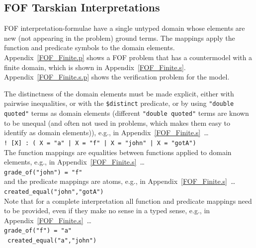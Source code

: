 \documentclass{easychair}
\newcommand{\smalltt}[1]{\small \texttt{#1}}
\begin{document}
\subsection{FOF Tarskian Interpretations}
\label{NewTarskianFOF}

FOF interpretation-formulae have a single untyped domain whose elements are new (not appearing 
in the problem) ground terms. 
The mappings apply the function and predicate symbols to the domain elements.
Appendix~\ref{FOF_Finite.p} shows a FOF problem that has a countermodel with a finite domain, 
which is shown in Appendix~\ref{FOF_Finite.s}.
Appendix~\ref{FOF_Finite.s.p} shows the verification problem for the model.

The distinctness of the domain elements must be made explicit, either with pairwise inequalities, 
or with the {\tt \$distinct} predicate, or by using {\tt "double quoted"} terms as domain 
elements (different {\tt "double quoted"} terms are known to be unequal (and often not used in 
problems, which makes them easy to identify as domain elements)), e.g., in 
Appendix~\ref{FOF_Finite.s}~\ldots \\
\hspace*{0.5cm}\smalltt{! [X] : ( X = "a" | X = "f" | X = "john" | X = "gotA")} \\
The function mappings are equalities between functions applied to domain elements, e.g., in 
Appendix~\ref{FOF_Finite.s}~\ldots \\
\hspace*{0.5cm}\smalltt{grade\_of("john") = "f"}\\
and the predicate mappings are atoms, e.g., in Appendix~\ref{FOF_Finite.s}~\ldots \\
\hspace*{0.5cm}\smalltt{created\_equal("john","gotA")}\\
Note that for a complete interpretation all function and predicate mappings need to be provided,
even if they make no sense in a typed sense, e.g., in Appendix~\ref{FOF_Finite.s}~\ldots \\
\hspace*{0.5cm}\smalltt{grade\_of("f") = "a"}\\
\hspace*{0.5cm}\smalltt{{\raisebox{0.4ex}{\texttildelow}} created\_equal("a","john")}

\end{document}

